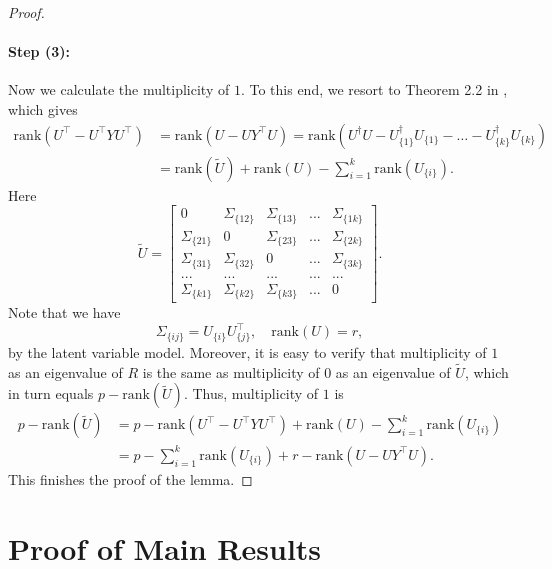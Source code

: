 \documentclass[11pt]{article}
\newcommand{\dc}[1]{\{#1\}} %
\newcommand{\0}{{\mathbf{0}}}
\newcommand{\rank}{{\mathrm{rank}}}
\begin{document}
\begin{proof}
\paragraph{Step (3):}
Now we calculate the multiplicity of $1$. 
To this end, we resort to Theorem 2.2 in \cite{tian2004rank}, which gives
\begin{align*}
\rank(U^\top -U^\top YU^\top )&=\rank(U-UY^\top U)=\rank(U^\dagger  U-U^\dagger_{\dc{1}} U_{\dc{1}}-\dots-U^\dagger_{\dc{k}} U_{\dc{k}})\\
&=\rank(\widetilde{U})+\rank(U)-\sum_{i=1}^k \rank(U_{\dc{i}}).
\end{align*}
Here 
\begin{equation*}
\widetilde{U}=
\begin{bmatrix}
         0 & \Sigma_{\dc{12}} & \Sigma_{\dc{13}}& ... & \Sigma_{\dc{1k}} \\
     \Sigma_{\dc{21}}  & 0 & \Sigma_{\dc{23}} & ... & \Sigma_{\dc{2k}} \\
      \Sigma_{\dc{31}} & \Sigma_{\dc{32}} & 0 & ... & \Sigma_{\dc{3k}} \\
      ... & ... & ... & ... & ... \\
      \Sigma_{\dc{k1}} & \Sigma_{\dc{k2}} & \Sigma_{\dc{k3}} & ... & 0
\end{bmatrix}.
\end{equation*}
Note that we have \begin{equation*}
\Sigma_{\dc{ij}}=U_{\dc{i}}U^\top_{\dc{j}}, \quad \rank(U)=r,
\end{equation*}
by the latent variable model. 
Moreover, it is easy to verify that multiplicity of $1$ as an eigenvalue of $R$ is the same as 
multiplicity of $0$ as an eigenvalue of $\widetilde{U}$, which in turn equals $p-\rank(\widetilde{U})$. 
Thus, multiplicity of $1$ is
\begin{align*}
p-\rank(\widetilde{U})& =p-\rank(U^\top -U^\top YU^\top )+\rank(U)-\sum_{i=1}^k \rank(U_{\dc{i}})\\
&=p-\sum_{i=1}^k \rank(U_{\dc{i}})+r- \rank(U-UY^\top U).
\end{align*}
This finishes the proof of the lemma. 
\end{proof}

\section{Proof of Main Results}
\label{sec:proof-main}
\end{document}
